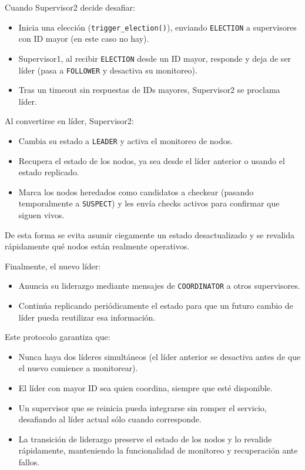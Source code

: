 Cuando Supervisor2 decide desafiar:
\begin{itemize}
    \item Inicia una elección (\texttt{trigger\_election()}), enviando \texttt{ELECTION} a supervisores con ID mayor (en este caso no hay).
    \item Supervisor1, al recibir \texttt{ELECTION} desde un ID mayor, responde y deja de ser líder (pasa a \texttt{FOLLOWER} y desactiva su monitoreo).
    \item Tras un timeout sin respuestas de IDs mayores, Supervisor2 se proclama líder.
\end{itemize}


Al convertirse en líder, Supervisor2:
\begin{itemize}
    \item Cambia su estado a \texttt{LEADER} y activa el monitoreo de nodos.
    \item Recupera el estado de los nodos, ya sea desde el líder anterior o usando el estado replicado.
    \item Marca los nodos heredados como candidatos a checkear (pasando temporalmente a \texttt{SUSPECT}) y les envía checks activos para confirmar que siguen vivos.
\end{itemize}

De esta forma se evita asumir ciegamente un estado desactualizado y se revalida rápidamente qué nodos están realmente operativos.


Finalmente, el nuevo líder:
\begin{itemize}
    \item Anuncia su liderazgo mediante mensajes de \texttt{COORDINATOR} a otros supervisores.
    \item Continúa replicando periódicamente el estado para que un futuro cambio de líder pueda reutilizar esa información.
\end{itemize}


Este protocolo garantiza que:
\begin{itemize}
    \item Nunca haya dos líderes simultáneos (el líder anterior se desactiva antes de que el nuevo comience a monitorear).
    \item El líder con mayor ID sea quien coordina, siempre que esté disponible.
    \item Un supervisor que se reinicia pueda integrarse sin romper el servicio, desafiando al líder actual sólo cuando corresponde.
    \item La transición de liderazgo preserve el estado de los nodos y lo revalide rápidamente, manteniendo la funcionalidad de monitoreo y recuperación ante fallos.
\end{itemize}


